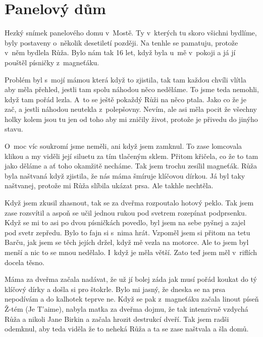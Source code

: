 
\chapter{Panelový dům}

Hezký snímek panelového domu v~Mostě. Ty v~kterých tu skoro všichni bydlíme,
byly postaveny o~několik desetiletí později. Na tenhle se pamatuju, protože
v~něm bydlela Růža. Bylo nám tak 16 let, když byla u~mě v~pokoji a já jí
pouštěl písničky z~magneťáku.

Problém byl s~mojí mámou která když to zjistila, tak tam každou chvíli vlítla
aby měla přehled, jestli tam spolu náhodou něco neděláme. To jsme teda nemohli,
když tam pořád lezla. A~to se ještě pokaždý Růži na něco ptala. Jako co že je
zač, a jestli náhodou neutekla z~polepšovny. Nevím, ale asi měla pocit že
všechny holky kolem jsou tu jen od toho aby mi zničily život, protože je
přivedu do jinýho stavu.

O~moc víc soukromí jsme neměli, ani když jsem zamknul. To zase lomcovala klikou
a my viděli její siluetu za tím tlačeným sklem. Přitom křičela, co že to tam
jako děláme a ať toho okamžitě necháme. Tak jsem trochu zesílil magneťák. Růža
byla naštvaná když zjistila, že nás máma šmíruje klíčovou dírkou. Já byl taky
naštvanej, protože mi Růža slíbila ukázat prsa. Ale takhle nechtěla.

Když jsem zkusil zhasnout, tak se za dveřma rozpoutalo hotový peklo. Tak jsem
zase rozsvítil a aspoň se učil jednou rukou pod svetrem rozepínat podprsenku.
Když se mi to asi po dvou písničkách povedlo, byl jsem na sebe pyšnej a zajel
pod svetr zepředu. Bylo to fajn si s~nima hrát. Vzpoměl jsem si přitom na tetu
Barču, jak jsem se těch jejích držel, když mě vezla na motorce. Ale to jsem byl
menší a nic to se mnou nedělalo. I~když je měla větší. Zato teď jsem měl
v~riflích docela těsno.

Máma za dveřma začala nadávat, že už jí bolej záda jak musí pořád koukat do tý
klíčový dírky a došla si pro štokrle. Bylo mi jasný, že dneska se na prsa
nepodívám a do kalhotek teprve ne. Když se pak z~magneťáku začala linout píseň
Ž-tém (Je T'aime), nabyla matka za dveřma dojmu, že tak intenzivně vzdychá Růža
a nikoli Jane Birkin a začala hrozit destrukcí dveří. Tak jsem radši odemknul,
aby teda viděla že to neheká Růža a ta se zase naštvala a šla domů.

